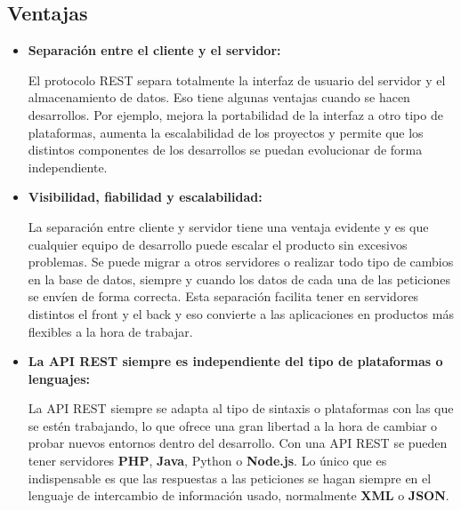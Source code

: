 \documentclass[10pt]{article}
\newcommand{\py}[1]{{\textcolor{B}{Python} #1}}
\newcommand{\rest}[1]{{\textcolor{Mag}{REST} #1}}
\begin{document}
\subsection{Ventajas}
\begin{itemize}
\item \textbf{Separación entre el cliente y el servidor:} 

El protocolo \rest{} separa totalmente la interfaz de usuario del servidor y el almacenamiento de datos. Eso tiene algunas ventajas cuando se hacen desarrollos. Por ejemplo, mejora la portabilidad de la interfaz a otro tipo de plataformas, aumenta la escalabilidad de los proyectos y permite que los distintos componentes de los desarrollos se puedan evolucionar de forma independiente.

\item  \textbf{Visibilidad, fiabilidad y escalabilidad:}

 La separación entre cliente y servidor tiene una ventaja evidente y es que cualquier equipo de desarrollo puede escalar el producto sin excesivos problemas. Se puede migrar a otros servidores o realizar todo tipo de cambios en la base de datos, siempre y cuando los datos de cada una de las peticiones se envíen de forma correcta. Esta separación facilita tener en servidores distintos el front y el back y eso convierte a las aplicaciones en productos más flexibles a la hora de trabajar.

\item \textbf{La API \rest{} siempre es independiente del tipo de plataformas o lenguajes:}

 La API \rest{} siempre se adapta al tipo de sintaxis o plataformas con las que se estén trabajando, lo que ofrece una gran libertad a la hora de cambiar o probar nuevos entornos dentro del desarrollo. Con una API \rest{} se pueden tener servidores \textbf{PHP}, \textbf{Java}, \py{} o \textbf{Node.js}. Lo único que es indispensable es que las respuestas a las peticiones se hagan siempre en el lenguaje de intercambio de información usado, normalmente \textbf{XML} o \textbf{JSON}.
\end{itemize}
\end{document}
